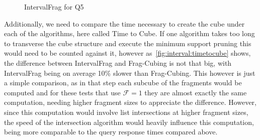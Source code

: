 \begin{figure}[H]
  \caption{IntervalFrag for Q5}\label{fig:interval:q5}
  \vspace{6mm}
  \begin{center}
  \end{center}
  \vspace{2mm}
\end{figure}

Additionally, we need to compare the time necessary to create the cube under each of the algorithms, here called Time to Cube.
If one algorithm takes too long to transverse the cube structure and execute the minimum support pruning this would need to be counted against it, however as~\autoref{fig:interval:timetocube} shows, the difference between IntervalFrag and Frag-Cubing is not that big, with IntervalFrag being on average 10\% slower than Frag-Cubing.
This however is just a simple comparison, as in that step each subcube of the fragments would be computed and for these tests that use $\mathcal{F} = 1$ they are almost exactly the same computation, needing higher fragment sizes to appreciate the difference.
However, since this computation would involve list intersections at higher fragment sizes, the speed of the intersection algorithm would heavily influence this computation, being more comparable to the query response times compared above.


